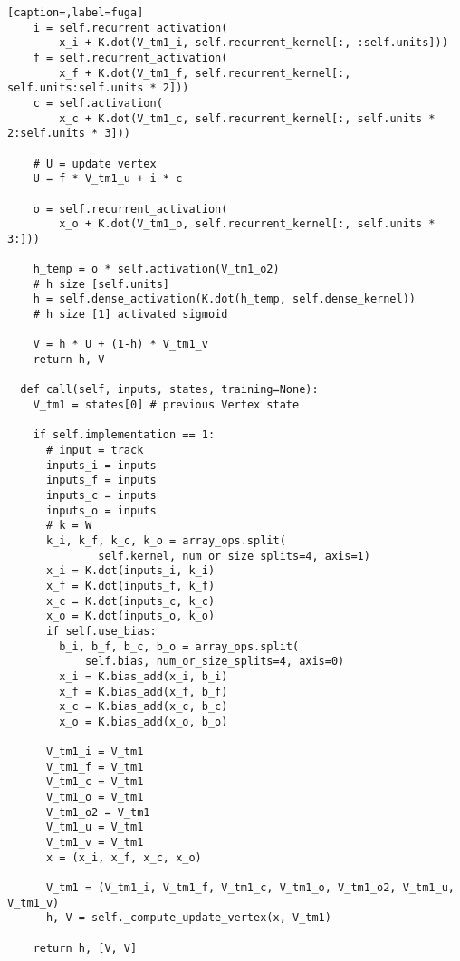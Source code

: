 \begin{lstlisting}[caption=,label=fuga]
    i = self.recurrent_activation(
        x_i + K.dot(V_tm1_i, self.recurrent_kernel[:, :self.units]))
    f = self.recurrent_activation(
        x_f + K.dot(V_tm1_f, self.recurrent_kernel[:, self.units:self.units * 2]))
    c = self.activation(
        x_c + K.dot(V_tm1_c, self.recurrent_kernel[:, self.units * 2:self.units * 3]))

    # U = update vertex
    U = f * V_tm1_u + i * c

    o = self.recurrent_activation(
        x_o + K.dot(V_tm1_o, self.recurrent_kernel[:, self.units * 3:]))

    h_temp = o * self.activation(V_tm1_o2)
    # h size [self.units]
    h = self.dense_activation(K.dot(h_temp, self.dense_kernel))
    # h size [1] activated sigmoid

    V = h * U + (1-h) * V_tm1_v
    return h, V

  def call(self, inputs, states, training=None):
    V_tm1 = states[0] # previous Vertex state

    if self.implementation == 1:
      # input = track
      inputs_i = inputs
      inputs_f = inputs
      inputs_c = inputs
      inputs_o = inputs
      # k = W
      k_i, k_f, k_c, k_o = array_ops.split(
              self.kernel, num_or_size_splits=4, axis=1)
      x_i = K.dot(inputs_i, k_i)
      x_f = K.dot(inputs_f, k_f)
      x_c = K.dot(inputs_c, k_c)
      x_o = K.dot(inputs_o, k_o)
      if self.use_bias:
        b_i, b_f, b_c, b_o = array_ops.split(
            self.bias, num_or_size_splits=4, axis=0)
        x_i = K.bias_add(x_i, b_i)
        x_f = K.bias_add(x_f, b_f)
        x_c = K.bias_add(x_c, b_c)
        x_o = K.bias_add(x_o, b_o)

      V_tm1_i = V_tm1
      V_tm1_f = V_tm1
      V_tm1_c = V_tm1
      V_tm1_o = V_tm1
      V_tm1_o2 = V_tm1
      V_tm1_u = V_tm1
      V_tm1_v = V_tm1
      x = (x_i, x_f, x_c, x_o)

      V_tm1 = (V_tm1_i, V_tm1_f, V_tm1_c, V_tm1_o, V_tm1_o2, V_tm1_u, V_tm1_v)
      h, V = self._compute_update_vertex(x, V_tm1)

    return h, [V, V]


\end{lstlisting}
